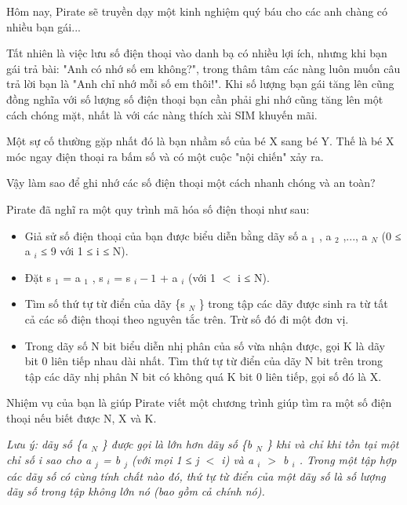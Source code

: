 Hôm nay, Pirate sẽ truyền dạy một kinh nghiệm quý báu cho các anh chàng có nhiều bạn gái...  

   Tất nhiên là việc lưu số điện thoại vào danh bạ có nhiều lợi ích, nhưng khi bạn gái trả bài: "Anh có nhớ số em không?", trong thâm tâm các nàng luôn muốn câu trả lời bạn là "Anh chỉ nhớ mỗi số em thôi!". Khi số lượng bạn gái tăng lên cũng đồng nghĩa với số lượng số điện thoại bạn cần phải ghi nhớ cũng tăng lên một cách chóng mặt, nhất là với các nàng thích xài SIM khuyến mãi.  

   Một sự cố thường gặp nhất đó là bạn nhầm số của bé X sang bé Y. Thế là bé X móc ngay điện thoại ra bấm số và có một cuộc "nội chiến" xảy ra.  

    Vậy làm sao để ghi nhớ các số điện thoại một cách nhanh chóng và an toàn?   

   Pirate đã nghĩ ra một quy trình mã hóa số điện thoại như sau:  
\begin{itemize}
	\item     Giả sử số điện thoại của bạn được biểu diễn bằng dãy số a    $_     1    $    , a    $_     2    $    ,..., a    $_     N    $    (0 ≤ a    $_     i    $    ≤ 9 với 1 ≤ i ≤ N).   
	\item     Đặt s    $_     1    $    = a    $_     1    $    , s    $_     i    $    = s    $_     i - 1    $    + a    $_     i    $    (với 1 $<$ i ≤ N).   
	\item     Tìm số thứ tự từ điển của dãy \{s    $_     N    $    \} trong tập các dãy được sinh ra từ tất cả các số điện thoại theo nguyên tắc trên. Trừ số đó đi một đơn vị.   
	\item     Trong dãy số N bit biểu diễn nhị phân của số vừa nhận được, gọi K là dãy bit 0 liên tiếp nhau dài nhất. Tìm thứ tự từ điển của dãy N bit trên trong tập các dãy nhị phân N bit có không quá K bit 0 liên tiếp, gọi số đó là X.   
\end{itemize}

   Nhiệm vụ của bạn là giúp Pirate viết một chương trình giúp tìm ra một số điện thoại nếu biết được N, X và K.  

\emph{    Lưu ý: dãy số \{a    $_     N    $    \} được gọi là lớn hơn dãy số \{b    $_     N    $    \} khi và chỉ khi tồn tại một chỉ số i sao cho a    $_     j    $    = b    $_     j    $    (với mọi 1 ≤ j $<$ i) và a    $_     i    $    $>$ b    $_     i    $    . Trong một tập hợp các dãy số có cùng tính chất nào đó, thứ tự từ điển của một dãy số là số lượng dãy số trong tập không lớn nó (bao gồm cả chính nó).   }